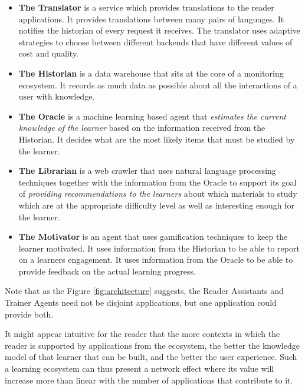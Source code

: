 \newcommand {\archiblock}[1]{\item {\bf #1}}
\begin{itemize}

		\archiblock{The Translator} is a service which provides translations to the reader applications. It provides translations between many pairs of languages. It notifies the historian of every request it receives. 
		The translator uses adaptive strategies to choose between different backends that have different values of cost and quality.

		\archiblock{The Historian} is a data warehouse that sits at the core of a monitoring ecosystem. It records as much data as possible about all the interactions of a user with knowledge. 

		\archiblock{The Oracle} is a machine learning based agent that {\em estimates the current knowledge of the learner} based on the information received from the Historian. It decides what are the most likely items that must be studied by the learner. 


		\archiblock {The Librarian} is a web crawler that uses natural language processing techniques together with the information from the Oracle to support its goal of {\em providing recommendations to the learners} about which materials to study which are at the appropriate difficulty level as well as interesting enough for the learner.

		\archiblock {The Motivator} is an agent that uses gamification techniques to keep the learner motivated. It uses information from the Historian to be able to report on a learners engagement. It uses information from the Oracle to be able to provide feedback on the actual learning progress. 

\end{itemize}

Note that as the Figure \ref{fig:architecture} suggests, the Reader Assistants and Trainer Agents need not be disjoint applications, but one application could provide both.

It might appear intuitive for the reader that the more contexts in which the reader is supported by applications from the ecosystem, the better the knowledge model of that learner that can be built, and the better the user experience. Such a learning ecosystem can thus present a network effect where its value will increase more than linear with the number of applications that contribute to it.



